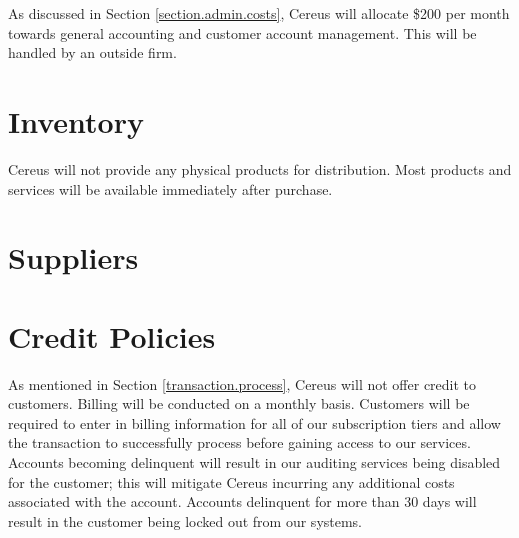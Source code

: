 As discussed in Section \ref{section.admin.costs}, Cereus will allocate \$200 per month towards general accounting and customer account management. This will be handled by an outside firm.

\section{Inventory}

Cereus will not provide any physical products for distribution. Most products and services will be available immediately after purchase.

\section{Suppliers}

\section{Credit Policies}

As mentioned in Section \ref{transaction.process}, Cereus will not offer credit to customers. Billing will be conducted on a monthly basis. Customers will be required to enter in billing information for all of our subscription tiers and allow the transaction to successfully process before gaining access to our services. Accounts becoming delinquent will result in our auditing services being disabled for the customer; this will mitigate Cereus incurring any additional costs associated with the account. Accounts delinquent for more than 30 days will result in the customer being locked out from our systems.


